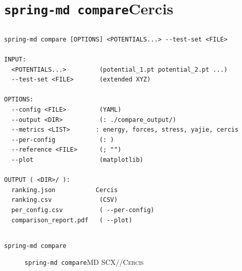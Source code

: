 \documentclass[12pt,a4paper]{article}
\theoremstyle{remark}
\newcommand{\Cercis}{\textsc{Cercis}}
\begin{document}
\newpage

\section{\texttt{spring-md compare}Cercis}

\subsection{}

\begin{lstlisting}[caption={\texttt{spring-md compare} },label=lst:compare]
spring-md compare [OPTIONS] <POTENTIALS...> --test-set <FILE>

INPUT:
  <POTENTIALS...>         (potential_1.pt potential_2.pt ...)
  --test-set <FILE>       (extended XYZ)

OPTIONS:
  --config <FILE>         (YAML)
  --output <DIR>          (: ./compare_output/)
  --metrics <LIST>       : energy, forces, stress, yajie, cercis
  --per-config            (: )
  --reference <FILE>      (; "")
  --plot                  (matplotlib)

OUTPUT ( <DIR>/ ):
  ranking.json           Cercis
  ranking.csv             (CSV)
  per_config.csv          ( --per-config)
  comparison_report.pdf   ( --plot)
\end{lstlisting}

\subsection{}

\texttt{spring-md compare}

\begin{figure}[H]
\centering
{}
\caption{\texttt{spring-md compare}MD
SCX//\Cercis{}}
\label{fig:compare_levels}
\end{figure}
\end{document}
